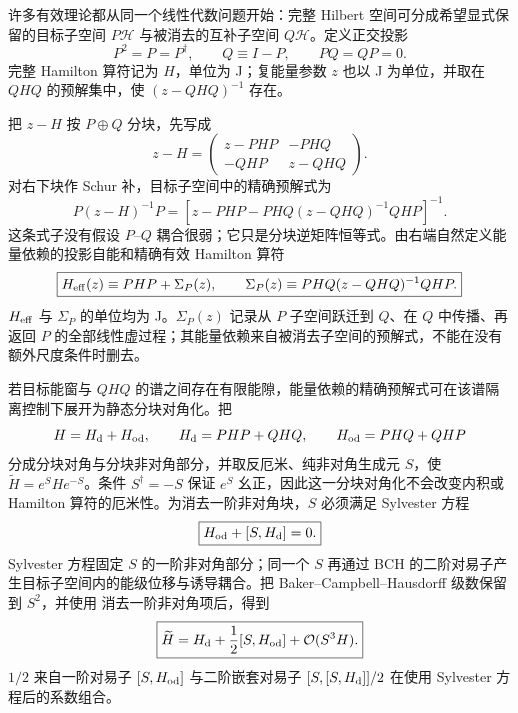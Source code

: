 
许多有效理论都从同一个线性代数问题开始：完整 Hilbert 空间可分成希望显式保留的目标子空间 $P\mathcal H$ 与被消去的互补子空间 $Q\mathcal H$。定义正交投影
\begin{equation*}
 P^2=P=P^\dagger,
 \qquad
 Q\equiv I-P,
 \qquad
 PQ=QP=0.
\end{equation*}
完整 Hamilton 算符记为 $H$，单位为 J；复能量参数 $z$ 也以 J 为单位，并取在 $QHQ$ 的预解集中，使 $(z-QHQ)^{-1}$ 存在。

把 $z-H$ 按 $P\oplus Q$ 分块，先写成
\begin{equation}
 \boxed{
 z-H=
 \begin{pmatrix}
 z-PHP & -PHQ\\
 -QHP & z-QHQ
 \end{pmatrix}.}
 \label{eq:feshbach-block-matrix-dp68}
\end{equation}
对右下块作 Schur 补，目标子空间中的精确预解式为
\begin{equation}
 \boxed{
 P(z-H)^{-1}P=
 \left[z-PHP-PHQ(z-QHQ)^{-1}QHP\right]^{-1}.}
 \label{eq:feshbach-schur-proof-r10}
\end{equation}
这条式子没有假设 $P$--$Q$ 耦合很弱；它只是分块逆矩阵恒等式。由右端自然定义能量依赖的投影自能和精确有效 Hamilton 算符
\begin{equation}
 \boxed{
 H_{\rm eff}(z)
 \equiv PHP+\Sigma_P(z),
 \qquad
 \Sigma_P(z)
 \equiv PHQ(z-QHQ)^{-1}QHP.}
 \label{eq:feshbach_schur_exact_positive_projection}
\end{equation}
$H_{\rm eff}$ 与 $\Sigma_P$ 的单位均为 J。$\Sigma_P(z)$ 记录从 $P$ 子空间跃迁到 $Q$、在 $Q$ 中传播、再返回 $P$ 的全部线性虚过程；其能量依赖来自被消去子空间的预解式，不能在没有额外尺度条件时删去。

若目标能窗与 $QHQ$ 的谱之间存在有限能隙，能量依赖的精确预解式可在该谱隔离控制下展开为静态分块对角化。把
\begin{equation*}
 H=H_{\rm d}+H_{\rm od},
 \qquad
 H_{\rm d}=PHP+QHQ,
 \qquad
 H_{\rm od}=PHQ+QHP
\end{equation*}
分成分块对角与分块非对角部分，并取反厄米、纯非对角生成元 $S$，使 $\widetilde H=e^SHe^{-S}$。条件 $S^\dagger=-S$ 保证 $e^S$ 幺正，因此这一分块对角化不会改变内积或 Hamilton 算符的厄米性。为消去一阶非对角块，$S$ 必须满足 Sylvester 方程
\begin{equation}
 \boxed{H_{\rm od}+[S,H_{\rm d}]=0.}
 \label{eq:sw-sylvester-r15}
\end{equation}
Sylvester 方程固定 $S$ 的一阶非对角部分；同一个 $S$ 再通过 BCH 的二阶对易子产生目标子空间内的能级位移与诱导耦合。把 Baker--Campbell--Hausdorff 级数保留到 $S^2$，并使用 消去一阶非对角项后，得到
\begin{equation}
 \boxed{
 \widetilde H
 =H_{\rm d}+\frac12[S,H_{\rm od}]
 +\mathcal O(S^3H).}
 \label{eq:sw-bch-second-r15}
\end{equation}
$1/2$ 来自一阶对易子 $[S,H_{\rm od}]$ 与二阶嵌套对易子 $[S,[S,H_{\rm d}]]/2$ 在使用 Sylvester 方程后的系数组合。

